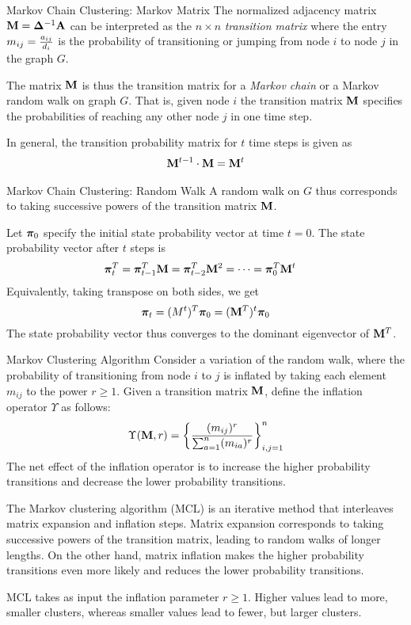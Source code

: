 \begin{frame}{Markov Chain Clustering: Markov Matrix}
The normalized adjacency matrix
$\mathbf{M} = {\bm \Delta}^{-1} \mathbf{A}$ can be interpreted as
the $n\times n$ {\em transition matrix} where the entry $m_{ij} =
{a_{ij} \over d_i}$ is the probability of
transitioning or jumping from node $i$ to node $j$ in the graph
$G$. 

\medskip
The matrix $\mathbf{M}$ is thus the transition matrix for a {\em Markov
chain} 
or a Markov random walk on
graph $G$. That is,
given node $i$ the transition matrix $\mathbf{M}$ specif\/{i}es the
probabilities of reaching any other node $j$ in one time step.


\medskip
In general, the transition probability matrix
for
 $t$ time steps is given as
\begin{align*}
     \mathbf{M}^{t-1} \cdot \mathbf{M} = \mathbf{M}^t
\end{align*}
\end{frame}

\begin{frame}{Markov Chain Clustering: Random Walk}
A random walk on $G$ thus corresponds to taking successive powers
of the transition matrix $\mathbf{M}$. 

\medskip
Let ${\bm \pi}_0$ specify the initial
state probability vector at time $t=0$.
The state probability vector after 
$t$ steps is
\begin{align*}
    {\bm \pi}_t^T & = {\bm \pi}_{t-1}^T \mathbf{M} =
    {\bm \pi}_{t-2}^T\mathbf{M}^2 = \cdots
     = {\bm \pi}_0^T \mathbf{M}^{t}
\end{align*}
Equivalently, taking transpose on both sides, we
get
  $${\bm \pi}_t  = (M^t)^T {\bm \pi}_0 = (\mathbf{M}^T)^t {\bm \pi}_0$$
The state probability vector thus converges to the dominant
eigenvector of $\mathbf{M}^T$.
\end{frame}


\begin{frame}{Markov Clustering Algorithm}
Consider a variation of the random walk, where the
probability of transitioning from node $i$ to $j$ is inflated by
taking each element $m_{ij}$ to the power $r \ge 1$. Given a
transition matrix $\mathbf{M}$, def\/{i}ne the inflation operator $\Upsilon$
as follows:
\begin{align*}
    \Upsilon(\mathbf{M},r) = \left\{
        \frac{(m_{ij})^r}{\sum_{a=1}^n (m_{ia})^r}
    \right\}_{i,j=1}^n
\end{align*}
The net
effect of the inflation operator is to increase the higher
probability transitions and decrease the lower probability
transitions.

\medskip
The Markov clustering
algorithm (MCL) is an iterative method that interleaves matrix expansion
and inflation steps. Matrix expansion corresponds to taking
successive powers of the transition matrix, leading to random
walks of longer lengths. On the other hand, matrix inflation makes
the higher probability transitions even more likely and reduces
the lower probability transitions.

\medskip
MCL
takes as input the inflation parameter $r\ge1$. Higher values lead
to more, smaller clusters, whereas smaller values lead to fewer,
but larger clusters.  

\end{frame}



